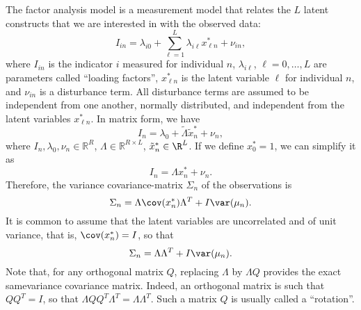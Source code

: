 \documentclass[12pt,a4paper]{article}
\begin{document}
The factor analysis model is a measurement model that relates the $L$
latent constructs that we are interested in with the observed data:
\[
I_{in} = \lambda_{i0} + \sum_{\ell=1}^L\lambda_{i \ell} x_{\ell n}^* + \nu_{in},
\]
where $I_{in}$ is the indicator $i$ measured for individual $n$,
$\lambda_{i \ell}$, $\ell=0, \ldots, L$ are parameters called
``loading factors'', $x_{\ell n}^*$ is the latent variable $\ell$ for
individual $n$, and $\nu_{in}$ is a disturbance term. All disturbance
terms are assumed to be independent from one another, normally
distributed, and independent from the latent variables $x_{\ell n}^*$.
In matrix form, we have
\[
I_n = \lambda_0 + \tilde{\Lambda} \tilde{x}^*_n  + \nu_n,
\]
where $I_n, \lambda_0, \nu_n \in \mathbb{R}^R$, $\Lambda \in \mathbb{R}^{R\times L}$, $\tilde{x}^*_n \in \R^{L}$.
If we define $x^*_0=1$, we can simplify it as
\[
I_n = \Lambda x^*_n  + \nu_n.
\]
Therefore, the variance covariance-matrix $\Sigma_n$ of the observations is
\[
\Sigma_n = \Lambda \cov(x^*_n) \Lambda^T + I \var(\mu_n).
\]
It is common to assume that the latent variables are uncorrelated and of unit variance, that is, $\cov(x^*_n) = I$, so that 
\[
\Sigma_n = \Lambda  \Lambda^T + I \var(\mu_n).
\]
Note that, for any orthogonal matrix $Q$, replacing $\Lambda$ by $\Lambda Q$ provides the exact samevariance covariance matrix. Indeed, an orthogonal matrix is such that $Q Q^T = I$, so that $\Lambda Q Q^T \Lambda^T = \Lambda  \Lambda^T$. Such a matrix $Q$ is usually called a ``rotation''. 
\end{document}
